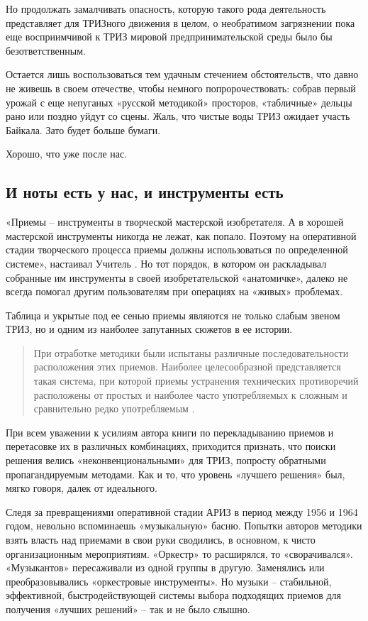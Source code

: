 \documentclass[11pt,a4paper]{article}
\begin{document}
Но продолжать замалчивать опасность, которую такого рода деятельность
представляет для ТРИЗного движения в целом, о необратимом загрязнении пока еще
восприимчивой к ТРИЗ мировой предпринимательской среды было бы
безответственным.

Остается лишь воспользоваться тем удачным стечением обстоятельств, что давно
не живешь в своем отечестве, чтобы немного попророчествовать: собрав первый
урожай с еще непуганых «русской методикой» просторов, «табличные» дельцы рано
или поздно уйдут со сцены. Жаль, что чистые воды ТРИЗ ожидает участь Байкала.
Зато будет больше бумаги.

Хорошо, что уже после нас.

\subsection*{И ноты есть у нас, и инструменты есть}

«Приемы -- инструменты в творческой мастерской изобретателя. А в хорошей
мастерской инструменты никогда не лежат, как попало. Поэтому на оперативной
стадии творческого процесса приемы должны использоваться по определенной
системе», настаивал Учитель \cite{Altshuller1961}. Но тот порядок, в котором
он раскладывал собранные им инструменты в своей изобретательской «анатомичке»,
далеко не всегда помогал другим пользователям при операциях на «живых»
проблемах.

Таблица и укрытые под ее сенью приемы являются не только слабым звеном ТРИЗ,
но и одним из наиболее запутанных сюжетов в ее истории.

\begin{quote}
  При отработке методики были испытаны различные последовательности
  расположения этих приемов. Наиболее целесообразной представляется такая
  система, при которой приемы устранения технических противоречий расположены
  от простых и наиболее часто употребляемых к сложным и сравнительно редко
  употребляемым \cite{Altshuller1961}.
\end{quote}

При всем уважении к усилиям автора книги по перекладыванию приемов и
перетасовке их в различных комбинациях, приходится признать, что поиски
решения велись «неконвенциональными» для ТРИЗ, попросту обратными
пропагандируемым методами. Как и то, что уровень «лучшего решения» был, мягко
говоря, далек от идеального.

Следя за превращениями оперативной стадии АРИЗ в период между 1956 и 1964
годом, невольно вспоминаешь «музыкальную» басню. Попытки авторов методики
взять власть над приемами в свои руки сводились, в основном, к чисто
организационным мероприятиям. «Оркестр» то расширялся, то «сворачивался».
«Музыкантов» пересаживали из одной группы в другую. Заменялись или
преобразовывались «оркестровые инструменты». Но музыки -- стабильной,
эффективной, быстродействующей системы выбора подходящих приемов для получения
«лучших решений» -- так и не было слышно.
\end{document}
